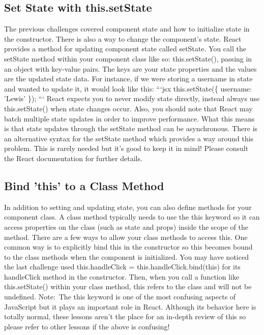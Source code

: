 \documentclass{article}%
\begin{document}
\subsection{Set State with this.setState}%
\label{subsec:SetStatewiththis.setState}%
The previous challenges covered component state and how to initialize state in the constructor. There is also a way to change the component's state. React provides a method for updating component state called setState. You call the setState method within your component class like so: this.setState(), passing in an object with key{-}value pairs. The keys are your state properties and the values are the updated state data. For instance, if we were storing a username in state and wanted to update it, it would look like this:\newline%
```jsx\newline%
this.setState(\{\newline%
  username: 'Lewis'\newline%
\});\newline%
```\newline%
React expects you to never modify state directly, instead always use this.setState() when state changes occur. Also, you should note that React may batch multiple state updates in order to improve performance. What this means is that state updates through the setState method can be asynchronous. There is an alternative syntax for the setState method which provides a way around this problem. This is rarely needed but it's good to keep it in mind! Please consult the React documentation for further details.\newline%

%
\subsection{Bind 'this' to a Class Method}%
\label{subsec:BindthistoaClassMethod}%
In addition to setting and updating state, you can also define methods for your component class. A class method typically needs to use the this keyword so it can access properties on the class (such as state and props) inside the scope of the method. There are a few ways to allow your class methods to access this.\newline%
One common way is to explicitly bind this in the constructor so this becomes bound to the class methods when the component is initialized. You may have noticed the last challenge used this.handleClick = this.handleClick.bind(this) for its handleClick method in the constructor. Then, when you call a function like this.setState() within your class method, this refers to the class and will not be undefined.\newline%
Note:~The this keyword is one of the most confusing aspects of JavaScript but it plays an important role in React. Although its behavior here is totally normal, these lessons aren't the place for an in{-}depth review of this so please refer to other lessons if the above is confusing!\newline%
\end{document}
